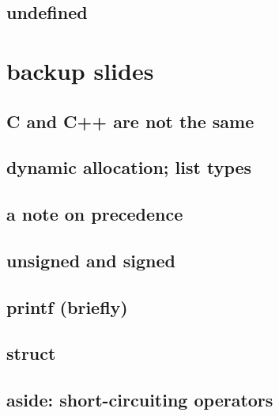 \subsection{undefined}



\section{backup slides}

\subsection{C and C++ are not the same}



\subsection{dynamic allocation; list types}



\subsection{a note on precedence}



\subsection{unsigned and signed}



\subsection{printf (briefly)}



\subsection{struct} 



\subsection{aside: short-circuiting operators}





